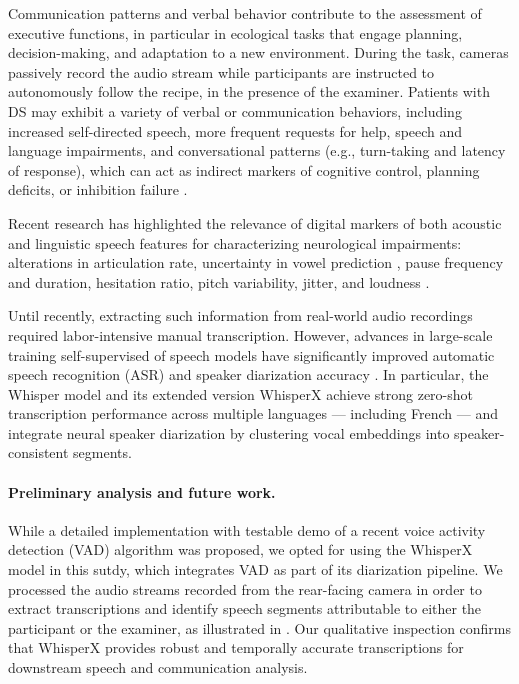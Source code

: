 Communication patterns and verbal behavior contribute to the assessment of executive functions,  in particular in ecological tasks that engage planning, decision-making, and adaptation to a new environment. During the task, cameras passively record the audio stream while participants are instructed to autonomously follow the recipe, in the presence of the examiner. Patients with DS may exhibit a variety of verbal or communication behaviors, including increased self-directed speech, more frequent requests for help, speech and language impairments, and conversational patterns (e.g., turn-taking and latency of response), which can act as indirect markers of cognitive control, planning deficits, or inhibition failure \cite{MartnezNicols2021,DeLooze2021, Konig2018, Toth2018}.

Recent research has highlighted the relevance of digital markers of both acoustic and linguistic speech features for characterizing neurological impairments: alterations in articulation rate, uncertainty in vowel prediction \cite{Isaev2023Ataxic}, pause frequency and duration, hesitation ratio, pitch variability, jitter, and loudness \cite{MartnezNicols2021, DeLooze2021, Konig2018, Toth2018}.

Until recently, extracting such information from real-world audio recordings required labor-intensive manual transcription. However, advances in large-scale training self-supervised of speech models have significantly improved automatic speech recognition (ASR) and speaker diarization accuracy \cite{baevski2020wav2vec}. In particular, the Whisper model \cite{whisper} and its extended version WhisperX \cite{bain2022whisperx} achieve strong zero-shot transcription performance across multiple languages — including French — and integrate neural speaker diarization by clustering vocal embeddings into speaker-consistent segments. 

\paragraph{Preliminary analysis and future work.\\}

While a detailed implementation with testable demo \cite{rvad_fast} of a recent voice activity detection (VAD) algorithm \cite{TAN20201} was proposed, we opted for using the WhisperX model in this sutdy, which integrates VAD as part of its diarization pipeline. We processed the audio streams recorded from the rear-facing camera in order to extract transcriptions and identify speech segments attributable to either the participant or the examiner, as illustrated in . Our qualitative inspection confirms that WhisperX provides robust and temporally accurate transcriptions for downstream speech and communication analysis. 

